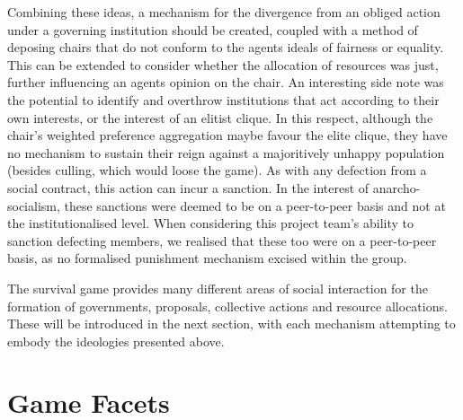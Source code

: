 
Combining these ideas, a mechanism for the divergence from an obliged action under a governing institution should be created, coupled with a method of deposing chairs that do not conform to the agents ideals of fairness or equality. This can be extended to consider whether the allocation of resources was just, further influencing an agents opinion on the chair. An interesting side note was the potential to identify and overthrow institutions that act according to their own interests, or the interest of an elitist clique. In this respect, although the chair's weighted preference aggregation maybe favour the elite clique, they have no mechanism to sustain their reign against a majoritively unhappy population (besides culling, which would loose the game). As with any defection from a social contract, this action can incur a sanction. In the interest of anarcho-socialism, these sanctions were deemed to be on a peer-to-peer basis and not at the institutionalised level. When considering this project team's ability to sanction defecting members, we realised that these too were on a peer-to-peer basis, as no formalised punishment mechanism excised within the group.  

The survival game provides many different areas of social interaction for the formation of governments, proposals, collective actions and resource allocations. These will be introduced in the next section, with each mechanism attempting to embody the ideologies presented above. 

\clearpage

\section{Game Facets}\label{sec: game facets}

